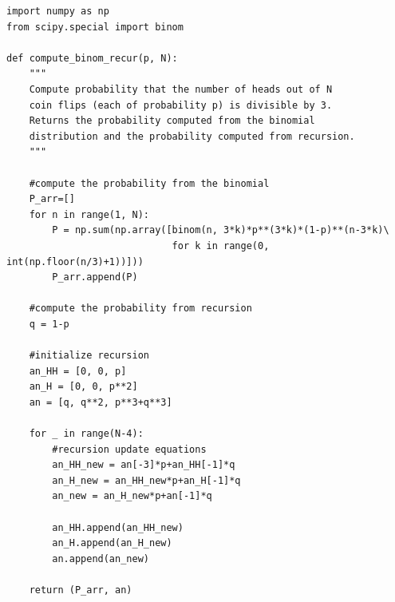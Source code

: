 \begin{problem}{4}
\begin{lstlisting}
import numpy as np
from scipy.special import binom

def compute_binom_recur(p, N):
    """
    Compute probability that the number of heads out of N 
    coin flips (each of probability p) is divisible by 3.
    Returns the probability computed from the binomial
    distribution and the probability computed from recursion.
    """
    
    #compute the probability from the binomial
    P_arr=[]
    for n in range(1, N):
        P = np.sum(np.array([binom(n, 3*k)*p**(3*k)*(1-p)**(n-3*k)\
                             for k in range(0, int(np.floor(n/3)+1))]))
        P_arr.append(P)
     
    #compute the probability from recursion
    q = 1-p
    
    #initialize recursion
    an_HH = [0, 0, p]
    an_H = [0, 0, p**2]
    an = [q, q**2, p**3+q**3]
    
    for _ in range(N-4):
        #recursion update equations
        an_HH_new = an[-3]*p+an_HH[-1]*q
        an_H_new = an_HH_new*p+an_H[-1]*q
        an_new = an_H_new*p+an[-1]*q

        an_HH.append(an_HH_new)
        an_H.append(an_H_new)
        an.append(an_new)
        
    return (P_arr, an)
\end{lstlisting}
\end{problem}











